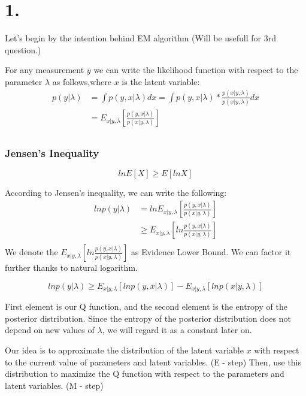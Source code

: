 \documentclass{article}
\begin{document}
\pagestyle{fancy}


\section*{1.}
Let's begin by the intention behind EM algorithm (Will be usefull for 3rd question.)

For any measurement $y$ we can write the likelihood function with respect to the parameter $\lambda$ as follows,where $x$ is the latent variable:
\[
\begin{aligned} 
p(y|\lambda) &= \int p(y,x|\lambda) dx = \int p(y,x|\lambda) *\frac{p(x|y,\lambda)}{p(x|y,\lambda)} dx \\
            &= E_{x|y,\lambda}\left[ \frac{p(y,x|\lambda)}{p(x|y,\lambda)} \right] \\
\end{aligned}
\]

\subsubsection*{Jensen's Inequality}   
\[
  ln E[X] \geq E[ln X]
\]

According to Jensen's inequality, we can write the following:
\[
\begin{aligned}
    ln p(y|\lambda) &= ln E_{x|y,\lambda}\left[ \frac{p(y,x|\lambda)}{p(x|y,\lambda)} \right] \\
    &\geq E_{x|y,\lambda}\left[ ln \frac{p(y,x|\lambda)}{p(x|y,\lambda)} \right] \\
\end{aligned}
\]
We denote the $E_{x|y,\lambda}\left[ ln \frac{p(y,x|\lambda)}{p(x|y,\lambda)} \right]$ as Evidence Lower Bound. We can factor it further thanks to natural logarithm.

\begin{equation}
    ln p(y|\lambda) \geq E_{x|y,\lambda}\left[ ln p(y,x|\lambda)\right] - E_{x|y,\lambda}\left[ ln p(x|y,\lambda) \right]
\end{equation}

First element is our Q function, and the second element is the entropy of the posterior distribution. Since the entropy of the posterior distribution
does not depend on new values of $\lambda$, we will regard it as a constant later on.

Our idea is to approximate the distribution of the latent variable $x$ with respect to the current value of parameters and latent variables. (E - step)
Then, use this distribution to maximize the Q function with respect to the parameters and latent variables. (M - step)
\end{document}
